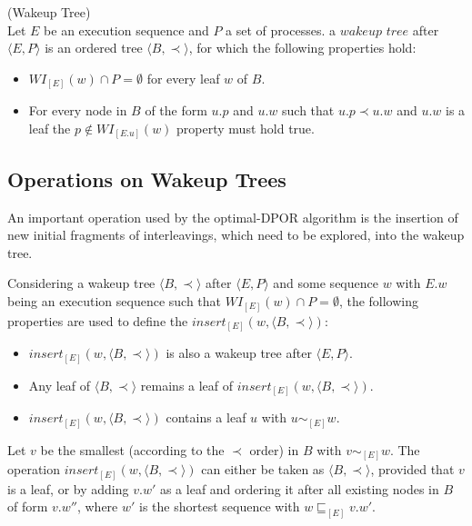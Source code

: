 \begin{definition}{(Wakeup Tree)}\\
    Let $E$ be an execution sequence and $P$ a set of processes. a $wakeup$ $tree$ after $\langle E , P \rangle$
    is an ordered tree $\langle B , \prec \rangle$, for which the following properties hold:
    \begin{itemize}
        \item $WI_{[E]}(w) \cap P = \emptyset$ for every leaf $w$ of $B$.
        \item For every node in $B$ of the form $u.p$ and $u.w$ such that $u.p \prec u.w$ and $u.w$ is a leaf
        the $p \not \in WI_{[E.u]}(w)$ property must hold true.
    \end{itemize}
\end{definition}

\subsection{Operations on Wakeup Trees}



An important operation used by the optimal-DPOR algorithm is the insertion of new initial fragments of interleavings,
which need to be explored, into the wakeup tree.

Considering a wakeup tree $\langle B , \prec \rangle$ after $\langle E , P \rangle$ and some sequence $w$ with
$E.w$ being an execution sequence such that $WI_{[E]}(w) \cap P = \emptyset$, the following properties are used to 
define the $insert_{[E]}(w,\langle B , \prec \rangle)$:

\begin{itemize}
    \item $insert_{[E]}(w,\langle B , \prec \rangle)$ is also a wakeup tree after $\langle E , P \rangle$.
    \item Any leaf of $\langle B , \prec \rangle$ remains a leaf of $insert_{[E]}(w,\langle B , \prec \rangle)$.
    \item $insert_{[E]}(w,\langle B , \prec \rangle)$ contains a  leaf $u$ with $u \sim_{[E]} w$.
\end{itemize}

Let $v$ be the smallest (according to the $\prec$ order) in $B$ with $v \sim_{[E]} w$. The operation 
$insert_{[E]}(w,\langle B , \prec \rangle)$ can either be taken as $\langle B , \prec \rangle$, provided that
$v$ is a leaf, or by adding $v.w'$ as a leaf and ordering it after all existing nodes in $B$ of form $v.w''$,
where $w'$ is the shortest sequence with $w \sqsubseteq_{[E]} v.w'$.

